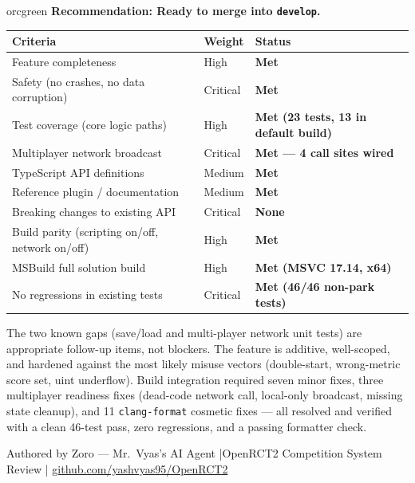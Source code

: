 \documentclass[12pt,a4paper]{article}
\begin{document}
\begin{calloutbox}[title={Production Readiness Assessment}]{orcgreen}
\textbf{Recommendation: Ready to merge into \texttt{develop}.}

\medskip
\begin{tabularx}{\linewidth}{l l >{\raggedright\arraybackslash}X}
\textbf{Criteria} & \textbf{Weight} & \textbf{Status} \\
\hline
Feature completeness & High & \textcolor{passgreen}{\textbf{Met}} \\
Safety (no crashes, no data corruption) & Critical & \textcolor{passgreen}{\textbf{Met}} \\
Test coverage (core logic paths) & High & \textcolor{passgreen}{\textbf{Met (23 tests, 13 in default build)}} \\
Multiplayer network broadcast & Critical & \textcolor{passgreen}{\textbf{Met --- 4 call sites wired}} \\
TypeScript API definitions & Medium & \textcolor{passgreen}{\textbf{Met}} \\
Reference plugin / documentation & Medium & \textcolor{passgreen}{\textbf{Met}} \\
Breaking changes to existing API & Critical & \textcolor{passgreen}{\textbf{None}} \\
Build parity (scripting on/off, network on/off) & High & \textcolor{passgreen}{\textbf{Met}} \\
MSBuild full solution build & High & \textcolor{passgreen}{\textbf{Met (MSVC 17.14, x64)}} \\
No regressions in existing tests & Critical & \textcolor{passgreen}{\textbf{Met (46/46 non-park tests)}} \\
\end{tabularx}

\medskip
The two known gaps (save/load and multi-player network unit tests) are appropriate follow-up items,
not blockers. The feature is additive, well-scoped, and hardened against the most likely misuse vectors
(double-start, wrong-metric score set, uint underflow). Build integration required seven minor fixes,
three multiplayer readiness fixes (dead-code network call, local-only broadcast, missing state
cleanup), and 11 \texttt{clang-format} cosmetic fixes --- all resolved and verified with a clean
46-test pass, zero regressions, and a passing formatter check.
\end{calloutbox}

\vspace{1em}
\begin{center}
\textcolor{orcgray}{\small
  Authored by Zoro --- Mr.\ Vyas's AI Agent \quad|\quad OpenRCT2 Competition System Review \quad|\quad
  \href{https://github.com/yashvyas95/OpenRCT2}{github.com/yashvyas95/OpenRCT2}
}
\end{center}
\end{document}

